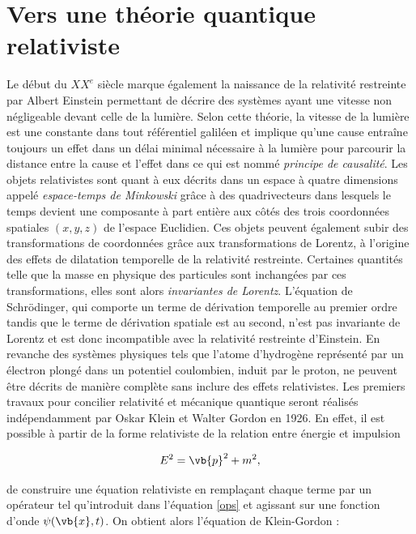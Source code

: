         \section{Vers une théorie quantique relativiste}
        \label{verslarelat}
        
         Le début du $XX^e$ siècle marque également la naissance de la relativité restreinte par Albert Einstein permettant de décrire des systèmes ayant une vitesse non négligeable devant celle de la lumière. Selon cette théorie, la vitesse de la lumière est une constante dans tout référentiel galiléen et implique qu'une cause entraîne toujours un effet dans un délai minimal nécessaire à la lumière pour parcourir la distance entre la cause et l'effet dans ce qui est nommé \textit{principe de causalité}. Les objets relativistes sont quant à eux décrits dans un espace à quatre dimensions appelé \textit{espace-temps de Minkowski} grâce à des quadrivecteurs dans lesquels le temps devient une composante à part entière aux côtés des trois coordonnées spatiales $(x,y,z)$ de l'espace Euclidien. Ces objets peuvent également subir des transformations de coordonnées grâce aux transformations de Lorentz, à l'origine des effets de dilatation temporelle de la relativité restreinte. Certaines quantités telle que la masse en physique des particules sont inchangées par ces transformations, elles sont alors \textit{invariantes de Lorentz}. L'équation de Schrödinger, qui comporte un terme de dérivation temporelle au premier ordre tandis que le terme de dérivation spatiale est au second, n'est pas invariante de Lorentz et est donc incompatible avec la relativité restreinte d'Einstein. En revanche des systèmes physiques tels que l'atome d'hydrogène représenté par un électron plongé dans un potentiel coulombien, induit par le proton, ne peuvent être décrits de manière complète sans inclure des effets relativistes. Les premiers travaux pour concilier relativité et mécanique quantique seront réalisés indépendamment par Oskar Klein et Walter Gordon en 1926. En effet, il est possible à partir de la forme relativiste de la relation entre énergie et impulsion 
        
        \begin{equation}
            E^2=\vb{p}^2+m^2,
            \label{Eprelation}
        \end{equation}

        de construire une équation relativiste en remplaçant chaque terme par un opérateur tel qu'introduit dans l'équation \ref{ops} et agissant sur une fonction d'onde $\psi(\vb{x},t)$. On obtient alors l'équation de Klein-Gordon :
        

